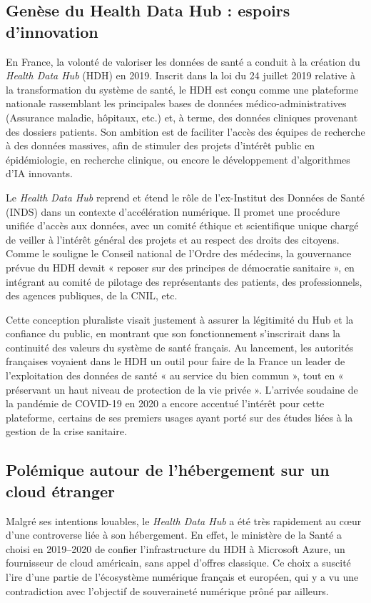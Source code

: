 \documentclass[10pt,a4paper]{article} %
\begin{document}
\subsection{Genèse du Health Data Hub : espoirs d’innovation}

En France, la volonté de valoriser les données de santé a conduit à la création du \textit{Health Data Hub} (HDH) en 2019. Inscrit dans la loi du 24 juillet 2019 relative à la transformation du système de santé, le HDH est conçu comme une plateforme nationale rassemblant les principales bases de données médico-administratives (Assurance maladie, hôpitaux, etc.) et, à terme, des données cliniques provenant des dossiers patients. Son ambition est de faciliter l’accès des équipes de recherche à des données massives, afin de stimuler des projets d’intérêt public en épidémiologie, en recherche clinique, ou encore le développement d’algorithmes d’IA innovants.

Le \textit{Health Data Hub} reprend et étend le rôle de l’ex-Institut des Données de Santé (INDS) dans un contexte d’accélération numérique. Il promet une procédure unifiée d’accès aux données, avec un comité éthique et scientifique unique chargé de veiller à l’intérêt général des projets et au respect des droits des citoyens. Comme le souligne le Conseil national de l’Ordre des médecins, la gouvernance prévue du HDH devait « reposer sur des principes de démocratie sanitaire », en intégrant au comité de pilotage des représentants des patients, des professionnels, des agences publiques, de la CNIL, etc.

Cette conception pluraliste visait justement à assurer la légitimité du Hub et la confiance du public, en montrant que son fonctionnement s’inscrirait dans la continuité des valeurs du système de santé français. Au lancement, les autorités françaises voyaient dans le HDH un outil pour faire de la France un leader de l’exploitation des données de santé « au service du bien commun », tout en « préservant un haut niveau de protection de la vie privée ». L’arrivée soudaine de la pandémie de COVID-19 en 2020 a encore accentué l’intérêt pour cette plateforme, certains de ses premiers usages ayant porté sur des études liées à la gestion de la crise sanitaire.


\subsection{Polémique autour de l’hébergement sur un cloud étranger}

Malgré ses intentions louables, le \textit{Health Data Hub} a été très rapidement au cœur d’une controverse liée à son hébergement. En effet, le ministère de la Santé a choisi en 2019–2020 de confier l’infrastructure du HDH à Microsoft Azure, un fournisseur de cloud américain, sans appel d’offres classique. Ce choix a suscité l’ire d’une partie de l’écosystème numérique français et européen, qui y a vu une contradiction avec l’objectif de souveraineté numérique prôné par ailleurs.
\end{document}
